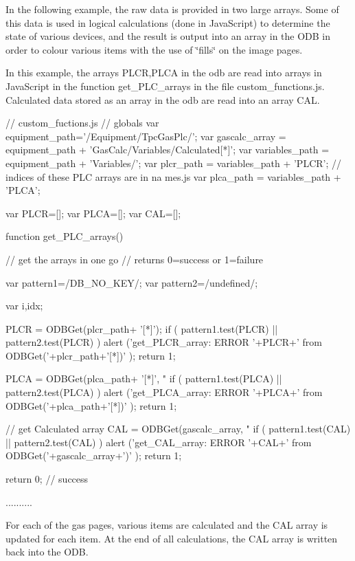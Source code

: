 In the following example, the raw data is provided in two large arrays. Some of this data is used in logical calculations (done in JavaScript) to determine the state of various devices, and the result is output into an array in the ODB in order to colour various items with the use of \char`\"{}fills\char`\"{} on the image pages. \par
 In this example, the arrays PLCR,PLCA in the odb are read into arrays in JavaScript in the function get\_\-PLC\_\-arrays in the file custom\_\-functions.js. Calculated data stored as an array in the odb are read into an array CAL. 
\begin{DoxyCode}
// custom_fuctions.js
// globals
var equipment_path='/Equipment/TpcGasPlc/';
var gascalc_array = equipment_path + 'GasCalc/Variables/Calculated[*]';
var variables_path = equipment_path + 'Variables/';
var plcr_path = variables_path + 'PLCR'; // indices of these PLC arrays are in na
      mes.js
var plca_path = variables_path + 'PLCA';

var PLCR=[];
var PLCA=[];
var CAL=[];

function get_PLC_arrays()
{  // get the arrays in one go
   // returns 0=success or 1=failure
 
  var pattern1=/DB_NO_KEY/;
  var pattern2=/undefined/;

  var i,idx;
    
  PLCR =     ODBGet(plcr_path+ '[*]');
  if ( pattern1.test(PLCR) ||  pattern2.test(PLCR)  )
  {
      alert ('get_PLCR_array: ERROR '+PLCR+' from ODBGet('+plcr_path+'[*])' );
      return 1;
  } 
  
   PLCA = ODBGet(plca_path+ '[*]', "%
   if ( pattern1.test(PLCA) ||  pattern2.test(PLCA)  )
   {
      alert ('get_PLCA_array: ERROR '+PLCA+' from ODBGet('+plca_path+'[*])' );
      return 1;
   }
              
// get Calculated array
   CAL = ODBGet(gascalc_array, "%
   if ( pattern1.test(CAL) ||  pattern2.test(CAL)  )
   {
      alert ('get_CAL_array: ERROR '+CAL+' from ODBGet('+gascalc_array+')' );
      return 1;
   }

   return 0; // success
}

..........
\end{DoxyCode}


For each of the gas pages, various items are calculated and the CAL array is updated for each item. At the end of all calculations, the CAL array is written back into the ODB.


